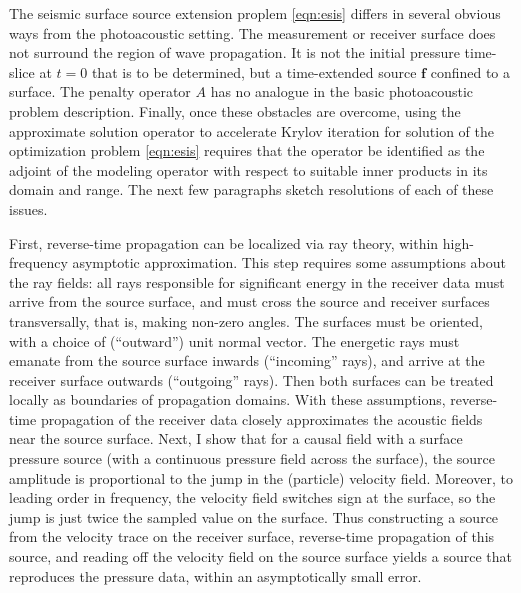 \documentclass[12pt]{geophysics}
\newcommand{\bff}{\mathbf{f}}
\begin{document}
The seismic surface source extension proplem \ref{eqn:esis} differs in
several obvious ways from the photoacoustic setting. The measurement
or receiver surface does not surround the region of wave
propagation. It is not the initial pressure time-slice at $t=0$ that
is to be determined, but a time-extended source $\bff$ confined to a
surface. The penalty operator $A$ has no analogue in the basic
photoacoustic problem description. Finally, once these obstacles are
overcome, using the approximate solution operator to accelerate Krylov
iteration for solution of the optimization problem \ref{eqn:esis}
requires that the operator be identified as the adjoint of the
modeling operator with respect to suitable inner products in its
domain and range. The next few paragraphs sketch resolutions of each
of these issues.

First, reverse-time propagation can be localized via ray theory,
within high-frequency asymptotic approximation. This step requires
some assumptions about the ray fields: all rays responsible for
significant energy in the receiver data must arrive from the source
surface, and must cross the source and receiver surfaces
transversally, that is, making non-zero angles. The surfaces must be
oriented, with a choice of (``outward'') unit normal vector. The
energetic rays must emanate
from the source surface inwards (``incoming'' rays), and
arrive at the receiver surface outwards (``outgoing'' rays). Then both surfaces
can be treated locally as
boundaries of propagation domains. 
With these assumptions, reverse-time propagation of the receiver data
closely approximates the acoustic fields near the source
surface. Next, I show that for a causal field with a surface pressure source (with a
continuous pressure field across the surface), the source amplitude is
proportional to the jump in the (particle) velocity field. Moreover,
to leading order in frequency, the velocity field switches sign at the
surface, so the jump is just twice the sampled value on the
surface. Thus constructing a source from the velocity trace on the
receiver surface, reverse-time propagation of this source, and reading off the velocity
field on the source surface yields a source that reproduces the
pressure data, within an asymptotically small error.
\end{document}
